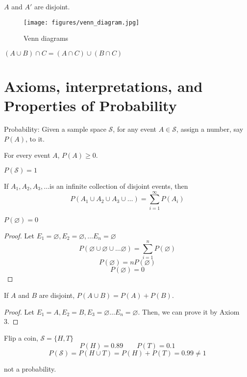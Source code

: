 \begin{prop}
$A$ and $A'$ are disjoint.
\end{prop}


\begin{figure}[H]
\texttt{[image: figures/venn\_diagram.jpg]}
\caption{Venn diagrams}
\label{fig:4}
\end{figure}

\begin{exmp}
  $(A\cup B)\cap C=(A \cap C)\cup(B \cap C)$
\end{exmp}


\section{Axioms, interpretations, and Properties of Probability}
Probability: Given a sample space $\mathcal{S}$, for any event $A\in \mathcal{S}$, assign a number, say $P(A)$, to it.
\begin{axio}
  For every event $A$, $P(A)\geq 0$.
\end{axio}

\begin{axio}
  $P(\mathcal{S})=1$
\end{axio}

\begin{axio}
If $A_1, A_2,A_3,\dots$is an infinite collection of disjoint events, then 
\[  P(A_1 \cup A_2\cup A_3 \cup \dots)=\sum_{i=1}^{\infty}P(A_i)	\]
\end{axio}

\begin{prop}
$P(\varnothing)=0$
\begin{proof}
Let $E_1=\varnothing,E_2=\varnothing,\dots E_n=\varnothing$
\[P(\varnothing \cup \varnothing \cup \dots \varnothing)=\sum_{i=1}^n P(\varnothing)\]
\[P(\varnothing)=nP(\varnothing)\]
\[P(\varnothing)=0\]
\end{proof}
\end{prop}

\begin{prop}
If $A$ and $B$ are disjoint, $P(A \cup B)=P(A)+P(B)$.
\begin{proof}
Let $E_1=A,E_2=B,E_3=\varnothing \dots E_n=\varnothing$. Then, we can prove it by Axiom 3.
\end{proof}
\end{prop}

\begin{exmp}
Flip a coin, $\mathcal{S}=\{H,T\}$
\[P(H)=0.89 \qquad P(T)=0.1\]
\[P(\mathcal{S})=P(H \cup T)=P(H)+P(T)=\boxed{0.99} \neq 1		\]

not a probability.
\end{exmp}


